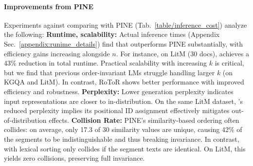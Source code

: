 \paragraph{Improvements from PINE}

Experiments against comparing \ours{} with PINE (Tab.~\ref{table/inference_cost}) analyze the following:
\textbf{Runtime, scalability:} Actual inference times (Appendix Sec.~\ref{appendix:runime_details}) find that \ours{} outperforms PINE substantially, with efficiency gains increasing alongside $n$. For instance, on LitM (30 docs), \ours{} achieves a 43\% reduction in total runtime. Practical scalability with increasing $k$ is critical, but we find that previous order-invariant LMs struggle handling larger $k$ (on KGQA and LitM). In contrast, RoToR shows better performance with improved efficiency and robustness.
\textbf{Perplexity:} Lower generation perplexity indicates input representations are closer to in-distribution. On the same LitM dataset, \ours{}’s reduced perplexity implies its positional ID assignment effectively mitigates out-of-distribution effects.
\textbf{Collision Rate:} PINE’s similarity-based ordering often collides: on average, only 17.3 of 30 similarity values are unique, causing 42\% of the segments to be indistinguishable and thus breaking invariance. In contrast, \ours{} with lexical sorting only collides if the segment texts are identical. On LitM, this yields zero collisions, preserving full invariance.
\begin{comment}
We conduct further comparison against PINE on a subset of datasets and report the results on Tab.~\ref{table/inference_cost}. \textbf{Runtime improvements. } In addition to the theoretical efficiency of \ours{} and PINE, Tab. \ref{table/inference_cost} measures the actual runtime of the two methods, with replication details on Appendix Sec.~\ref{appendix:runime_details}. Our findings reveal that \ours{} significantly reduces inference time compared to PINE, with efficiency gains increasing as $n$ grows. For instance, on the Lost-in-the-Middle benchmark with ndoc=30, \ours{} reduces total inference time by up to 43\%. \textbf{Perplexity.} As we suppose model generation perplexity is related to how much OOD the input representation is, lower perplexity on the same input (Lost-in-the middle dataset) implies that the positional ID assignment of \ours{} effectively minimizes the OOD effect. \textbf{Collision Rate} We notice that only 17.3 (/30) distinct similarity values are created in average, with 42\% of similarity values indistinguishable. This leads segments with same attention scores to collide, resulting in non-invariance in practice. In contrast, we cannot encounter collision between two segments unless the texts are exactly the same by the definition of lexical sorting which is a function solely dependent on the encoded input ids of segments. On the LitM benchmark, we are able to confirm no (zero) collision between all segments by lexical sorting, which safely guards the invariance property.
\end{comment}

